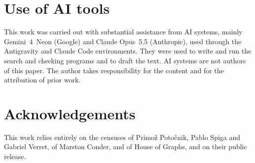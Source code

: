 \documentclass[11pt]{amsart}
\theoremstyle{remark}
\begin{document}
\section*{Use of AI tools}
This work was carried out with substantial assistance from AI systems, mainly
Gemini~4~Neon (Google) and Claude Opus~5.5 (Anthropic), used through the
Antigravity and Claude Code environments. They were used to write and run the
search and checking programs and to draft the text. AI systems are not authors
of this paper. The author takes responsibility for the content and for the
attribution of prior work.

\section*{Acknowledgements}
This work relies entirely on the censuses of Primož Potočnik, Pablo Spiga and
Gabriel Verret, of Marston Conder, and of House of Graphs, and on their public
release.
\end{document}
